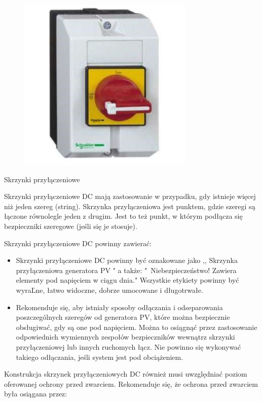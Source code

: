 \documentclass[12pt,a4paper]{article}
\begin{document}
\begin{figure}[h]
\centering
\includegraphics[natwidth=8.40cm,natheight=8.40cm]{media/image24.jpg}
\end{figure}
 

\textbf{ }

Skrzynki przyłączeniowe 

Skrzynki przyłączeniowe DC mają zastosowanie w przypadku, gdy istnieje 
więcej niż jeden szereg (string). Skrzynka przyłączeniowa jest punktem, 
gdzie szeregi są łączone równolegle jeden z drugim. Jest to też punkt, w 
którym podłącza się bezpieczniki szeregowe (jeśli się je stosuje). 

Skrzynki przyłączeniowe DC powinny zawierać: 

\begin{itemize}
\item Skrzynki przyłączeniowe DC powinny być oznakowane jako ,, Skrzynka 
przyłączeniowa generatora PV " a także: "\, Niebezpieczeństwo! Zawiera 
elementy pod napięciem w ciągu dnia." Wszystkie etykiety powinny być 
wyraĽne, łatwo widoczne, dobrze umocowane i długotrwałe. 
\item Rekomenduje się, aby istniały sposoby odłączania i odseparowania 
poszczególnych szeregów od generatora PV, które można bezpiecznie 
obsługiwać, gdy są one pod napięciem. Można to osiągnąć przez 
zastosowanie odpowiednich wymiennych zespołów bezpieczników wewnątrz 
skrzynki przyłączeniowej lub innych ruchomych łącz. Nie powinno się 
wykonywać takiego odłączania, jeśli system jest pod obciążeniem. 
\end{itemize}
Konstrukcja skrzynek przyłączeniowych DC również musi uwzględniać poziom 
oferowanej ochrony przed zwarciem. Rekomenduje się, że ochrona przed 
zwarciem była osiągana przez: 
\end{document}
